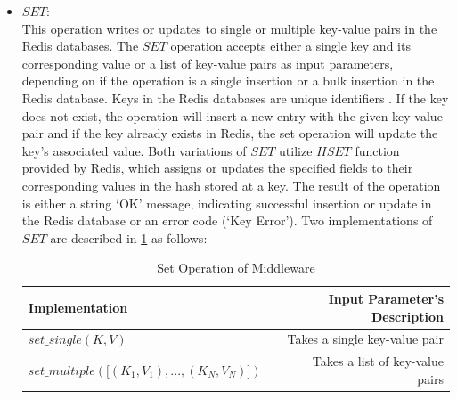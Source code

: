 \begin{itemize}

\item[-] $SET:$ \\
This operation writes or updates to single or multiple key-value pairs in the Redis databases. The $SET$ operation accepts either a single key and its corresponding value or a list of key-value pairs as input parameters, depending on if the operation is a single insertion or a bulk insertion in the Redis database. Keys in the Redis databases are unique identifiers \cite{da2015redis}. If the key does not exist, the operation will insert a new entry with the given key-value pair and if the key already exists in Redis, the set operation will update the key’s associated value. Both variations of $SET$ utilize $HSET$ function provided by Redis, which assigns or updates the specified fields to their corresponding values in the hash stored at a key. The result of the operation is either a string ‘OK’ message, indicating successful insertion or update in the Redis database or an error code (‘Key Error’). Two implementations of $SET$ are described in \cref{set_op} as follows: 
\begin{table} [H]
\centering
\begin{tabular}{@{} lcr @{}} %
	\toprule
	Implementation && Input Parameter’s Description	\\
	\midrule
	$set\_single (K,V)$	&&	Takes a single key-value pair  \\
	$set\_multiple(\bigl[(K_{1}, V_{1}), ... , (K_{N}, V_{N})\bigr])$	&&	Takes a list of key-value pairs\\
	\bottomrule
\end{tabular}
\caption[]{Set Operation of Middleware}
\label{set_op}
\end{table}

\end{itemize}
